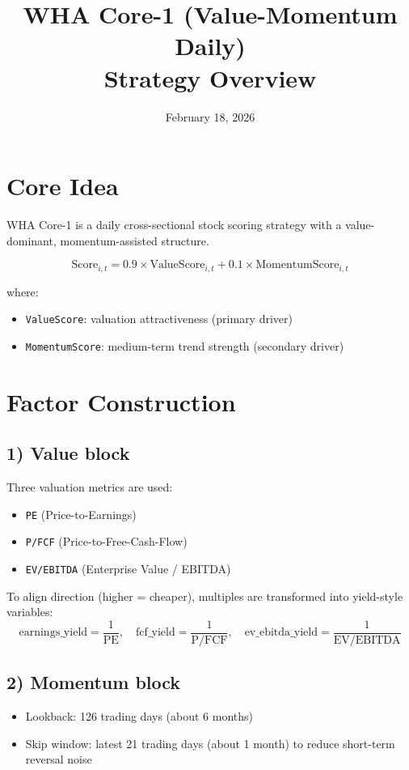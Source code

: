 \documentclass[12pt,a4paper]{article}
\title{WHA Core-1 (Value-Momentum Daily)\\Strategy Overview}
\author{}
\date{February 18, 2026}
\begin{document}
\maketitle

\section{Core Idea}
WHA Core-1 is a daily cross-sectional stock scoring strategy with a value-dominant, momentum-assisted structure.

\[
\mathrm{Score}_{i,t}=0.9\times\mathrm{ValueScore}_{i,t}+0.1\times\mathrm{MomentumScore}_{i,t}
\]

where:
\begin{itemize}
  \item \texttt{ValueScore}: valuation attractiveness (primary driver)
  \item \texttt{MomentumScore}: medium-term trend strength (secondary driver)
\end{itemize}

\section{Factor Construction}
\subsection*{1) Value block}
Three valuation metrics are used:
\begin{itemize}
  \item \texttt{PE} (Price-to-Earnings)
  \item \texttt{P/FCF} (Price-to-Free-Cash-Flow)
  \item \texttt{EV/EBITDA} (Enterprise Value / EBITDA)
\end{itemize}

To align direction (higher = cheaper), multiples are transformed into yield-style variables:
\[
\mathrm{earnings\_yield}=\frac{1}{\mathrm{PE}},\quad
\mathrm{fcf\_yield}=\frac{1}{\mathrm{P/FCF}},\quad
\mathrm{ev\_ebitda\_yield}=\frac{1}{\mathrm{EV/EBITDA}}
\]

\subsection*{2) Momentum block}
\begin{itemize}
  \item Lookback: 126 trading days (about 6 months)
  \item Skip window: latest 21 trading days (about 1 month) to reduce short-term reversal noise
\end{itemize}
\end{document}
